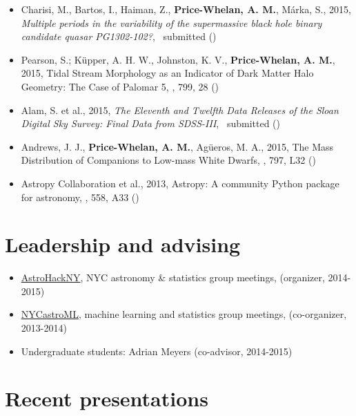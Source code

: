 \documentclass[12pt,letterpaper]{article}
\begin{document}
	\begin{itemize}
	
\item Charisi, M., Bartos, I., Haiman, Z., {\bf Price-Whelan, A. M.}, M\'arka, S., 2015,
    \emph{Multiple periods in the variability of the supermassive black hole binary candidate quasar PG1302-102?},
    \mnras\ submitted ()

\item Pearson, S.; K\"upper, A. H. W., Johnston, K. V., {\bf Price-Whelan, A. M.}, 2015,
    {Tidal Stream Morphology as an Indicator of Dark Matter Halo Geometry: The Case of Palomar 5},
    \apj, 799, 28 ()
    
\item Alam, S. et al., 2015,
    \emph{The Eleventh and Twelfth Data Releases of the Sloan Digital Sky Survey: Final Data from SDSS-III},
    \apjs\ submitted ()
    
\item Andrews, J. J., {\bf Price-Whelan, A. M.}, Ag\"ueros, M. A., 2015,
    {The Mass Distribution of Companions to Low-mass White Dwarfs},
    \apjl, 797, L32 ()
    
\item Astropy Collaboration et al., 2013, 
    {Astropy: A community Python package for astronomy},
    \aanda, 558, A33 ()
    
	\end{itemize}

\section*{Leadership and advising}
	\begin{itemize}
	\item \href{https://groups.google.com/forum/#!forum/astrohackny}{AstroHackNY}, NYC astronomy \& statistics group meetings, (organizer, 2014-2015)
	\item \href{https://github.com/adrn/nycastroml}{NYCastroML}, machine learning and statistics group meetings, (co-organizer, 2013-2014)
	\item Undergraduate students: Adrian Meyers (co-advisor, 2014-2015)
	\end{itemize}

\section*{Recent presentations}
\end{document}
